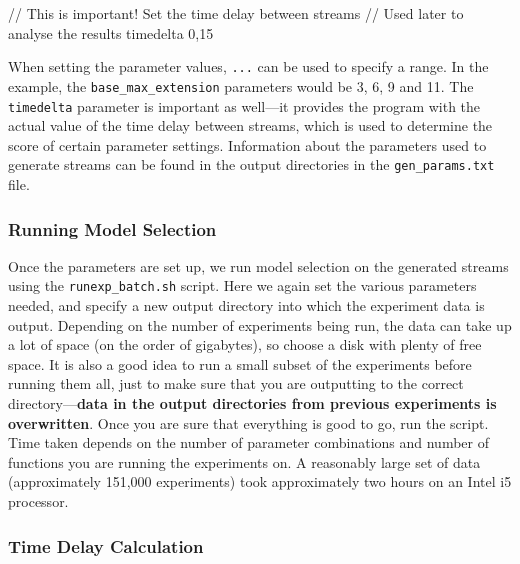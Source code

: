 \documentclass[a4paper,11pt]{article}
\begin{document}
\begin{appendices}
\begin{verbatimtab}
// This is important! Set the time delay between streams
// Used later to analyse the results
timedelta 0,15
\end{verbatimtab}
\normalsize

When setting the parameter values, \texttt{...} can be used to specify a
range. In the example, the \texttt{base\_max\_extension} parameters would be 3,
6, 9 and 11. The \texttt{timedelta} parameter is important as well---it provides
the program with the actual value of the time delay between streams, which is
used to determine the score of certain parameter settings. Information about the
parameters used to generate streams can be found in the output directories in
the \texttt{gen\_params.txt} file.
\subsubsection{Running Model Selection}
\label{sec-10-3-4}

Once the parameters are set up, we run model selection on the generated streams
using the \texttt{runexp\_batch.sh} script. Here we again set the various
parameters needed, and specify a new output directory into which the experiment
data is output. Depending on the number of experiments being run, the data can
take up a lot of space (on the order of gigabytes), so choose a disk with plenty
of free space. It is also a good idea to run a small subset of the experiments
before running them all, just to make sure that you are outputting to the
correct directory---\textbf{data in the output directories from previous
experiments is overwritten}. Once you are sure that everything is good to go,
run the script. Time taken depends on the number of parameter combinations and
number of functions you are running the experiments on. A reasonably large set
of data (approximately 151,000 experiments) took approximately two hours on an
Intel i5 processor.
\subsubsection{Time Delay Calculation}
\label{sec-10-3-5}


\end{appendices}
\end{document}
